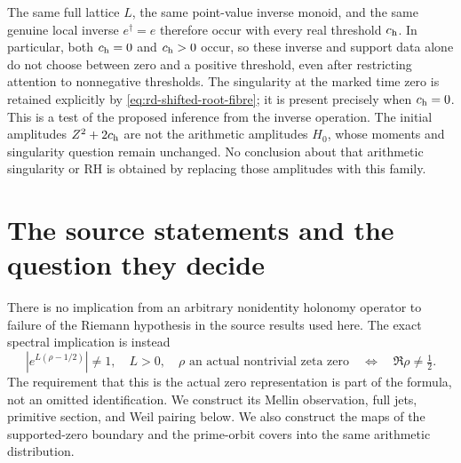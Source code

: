 \documentclass[11pt,a4paper]{article}
\theoremstyle{definition}\newtheorem{definition}[theorem]{Definition}
\newcommand{\B}{\mathbb B}\newcommand{\N}{\mathbb N}
\begin{document}
The same full lattice $L$, the same point-value inverse monoid,
and the same genuine local inverse $e^\dagger=e$ therefore occur
with every real threshold $c_{\rm h}$. In particular, both
$c_{\rm h}=0$ and $c_{\rm h}>0$ occur, so these inverse and
support data alone do not choose between zero and a positive
threshold, even after restricting attention to nonnegative
thresholds. The singularity at the marked time zero is retained
explicitly by \eqref{eq:rd-shifted-root-fibre}; it is present
precisely when $c_{\rm h}=0$. This is a test of the proposed
inference from the inverse operation. The initial amplitudes
$Z^2+2c_{\rm h}$ are not the arithmetic amplitudes $H_0$, whose
moments and singularity question remain unchanged. No conclusion
about that arithmetic singularity or RH is obtained by replacing
those amplitudes with this family.


\begingroup
\renewcommand{\B}{\mathscr B}
\renewcommand{\tr}{\operatorname{Tr}}

\section{The source statements and the question they decide}

There is no implication from an arbitrary nonidentity holonomy
operator to failure of the Riemann hypothesis in the source results
used here. The exact spectral implication is instead
\[
 \left|e^{L(\rho-1/2)}\right|\ne1,\quad L>0,\quad
 \rho\text{ an actual nontrivial zeta zero}
 \quad\Longleftrightarrow\quad \Re\rho\ne\tfrac12.
 \tag{HW1}\label{hw:criterion}
\]
The requirement that this is the actual zero representation is
part of the formula, not an omitted identification. We construct its
Mellin observation, full jets, primitive section, and Weil pairing
below. We also construct the maps of the supported-zero boundary and
the prime-orbit covers into the same arithmetic distribution.
\end{document}
